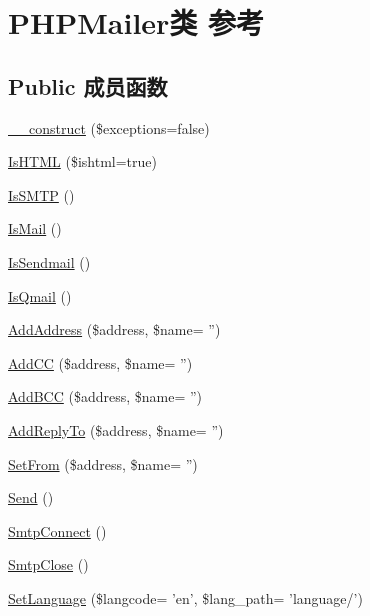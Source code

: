 \hypertarget{classPHPMailer}{\section{P\+H\+P\+Mailer类 参考}
\label{classPHPMailer}
}
\subsection*{Public 成员函数}
\begin{DoxyCompactItemize}
\item 
\hyperlink{classPHPMailer_a7db7d7c8a66de77de19b44e38319bb74}{\+\_\+\+\_\+construct} (\$exceptions=false)
\item 
\hyperlink{classPHPMailer_a85eec7e7cf0cfb07653fc8642b36f644}{Is\+H\+T\+M\+L} (\$ishtml=true)
\item 
\hyperlink{classPHPMailer_acba6e87e0af0baa5bda1026a4e99e236}{Is\+S\+M\+T\+P} ()
\item 
\hyperlink{classPHPMailer_a6c4e6445c6f12b87462cf9ab63239c1b}{Is\+Mail} ()
\item 
\hyperlink{classPHPMailer_a7cdd2b399559d7b36f0259c8f7924b07}{Is\+Sendmail} ()
\item 
\hyperlink{classPHPMailer_a7c2d3d01329eaa84d9da0b9490351030}{Is\+Qmail} ()
\item 
\hyperlink{classPHPMailer_a278520a47bb3d7387ff259464d94be21}{Add\+Address} (\$address, \$name= '')
\item 
\hyperlink{classPHPMailer_a3a68f4df5277a7332fc498b205045616}{Add\+C\+C} (\$address, \$name= '')
\item 
\hyperlink{classPHPMailer_a5d2d5f530005db5329912a5ffc9bffdd}{Add\+B\+C\+C} (\$address, \$name= '')
\item 
\hyperlink{classPHPMailer_aa19b774f8f3eacf0af5aca25f5509b24}{Add\+Reply\+To} (\$address, \$name= '')
\item 
\hyperlink{classPHPMailer_ac9cfb38512abb09ad381529a8bc0ca1a}{Set\+From} (\$address, \$name= '')
\item 
\hyperlink{classPHPMailer_a675cc2f9ff744a7819e62ebbd76a2ce1}{Send} ()
\item 
\hyperlink{classPHPMailer_a4d5a553ee27415465c48143a2b3fdcde}{Smtp\+Connect} ()
\item 
\hyperlink{classPHPMailer_a20b4519c300896aff5c22e3710aa19cb}{Smtp\+Close} ()
\item 
\hyperlink{classPHPMailer_a39ac3b2e56c56e0efdbc1e71f69a0d9f}{Set\+Language} (\$langcode= 'en', \$lang\+\_\+path= 'language/')
\item 

\end{DoxyCompactItemize}
